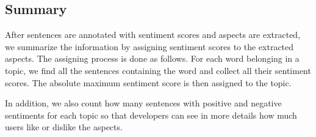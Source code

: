 \subsection{Summary}
\label{Summary}
After sentences are annotated with sentiment scores and aspects are extracted, we summarize the information by assigning sentiment scores to the extracted aspects. The assigning process is done as follows. For each word belonging in a topic, we find all the sentences containing the word and collect all their sentiment scores. The absolute maximum sentiment score is then assigned to the topic.

In addition, we also count how many sentences with positive and negative sentiments for each topic so that developers can see in more details how much users like or dislike the aspects. 


